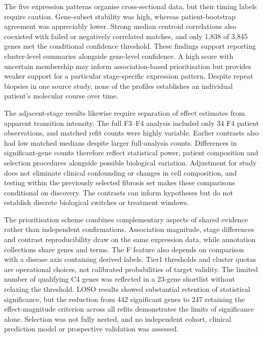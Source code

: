 \documentclass[11pt,a4paper]{article}
\begin{document}
The five expression patterns organise cross-sectional data, but their timing labels require caution. Gene-subset stability was high, whereas patient-bootstrap agreement was appreciably lower. Strong median centroid correlations also coexisted with failed or negatively correlated matches, and only 1,838 of 3,845 genes met the conditional confidence threshold. These findings support reporting cluster-level summaries alongside gene-level confidence. A high score with uncertain membership may inform association-based prioritisation but provides weaker support for a particular stage-specific expression pattern. Despite repeat biopsies in one source study, none of the profiles establishes an individual patient's molecular course over time.

The adjacent-stage results likewise require separation of effect estimates from apparent transition intensity. The full F3–F4 analysis included only 34 F4 patient observations, and matched refit counts were highly variable. Earlier contrasts also had low matched medians despite larger full-analysis counts. Differences in significant-gene counts therefore reflect statistical power, patient composition and selection procedures alongside possible biological variation. Adjustment for study does not eliminate clinical confounding or changes in cell composition, and testing within the previously selected fibrosis set makes these comparisons conditional on discovery. The contrasts can inform hypotheses but do not establish discrete biological switches or treatment windows.

The prioritisation scheme combines complementary aspects of shared evidence rather than independent confirmations. Association magnitude, stage differences and contrast reproducibility draw on the same expression data, while annotation collections share genes and terms. The F feature also depends on comparison with a disease axis containing derived labels. Tier1 thresholds and cluster quotas are operational choices, not calibrated probabilities of target validity. The limited number of qualifying C4 genes was reflected in a 23-gene shortlist without relaxing the threshold. LOSO results showed substantial retention of statistical significance, but the reduction from 442 significant genes to 247 retaining the effect-magnitude criterion across all refits demonstrates the limits of significance alone. Selection was not fully nested, and no independent cohort, clinical prediction model or prospective validation was assessed.
\end{document}
